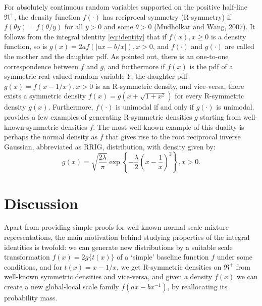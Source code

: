 \documentclass[lineno]{biometrika}
\begin{document}
For absolutely continuous random variables supported on the positive half-line $\Re^{+}$, the density function $f(\cdot)$ has reciprocal symmetry (R-symmetry) if $f(\theta y) = f(\theta / y)$ for all $y > 0$ and some $\theta >0$ (Mudholkar and Wang, 2007). It follows from the integral identity \eqref{eq:identity} that if $f(x), x \geq 0$ is a density function, so is $g(x) = 2a f(|ax-b/x|), x >0$, and $f(\cdot)$ and $g(\cdot)$ are called the mother and the daughter pdf. As \cite{chaubey2010reciprocal} pointed out, there is an one-to-one correspondence between $f$ and $g$, and furthermore if $f(x)$ is the pdf of a symmetric real-valued random variable $Y$, the daughter pdf $g(x) = f(x-1/x), x>0$ is an R-symmetric density, and vice-versa, there exists a symmetric density $f(x) = g(x+\sqrt{1+x^2})$ for every R-symmetric density $g(x)$. Furthermore, $f(\cdot)$ is unimodal if and only if $g(\cdot)$ is unimodal. \cite{chaubey2010reciprocal} provides a few examples of generating R-symmetric densities $g$ starting from well-known symmetric densities $f$. The most well-known example of this duality is perhaps the normal density as $f$ that gives rise to the root reciprocal inverse Gaussian, abbreviated as RRIG, distribution, with density given by: 
$$
g(x) = \sqrt{\frac{2\lambda}{\pi}} \exp \left\{ - \frac{\lambda}{2} \left( x - \frac{1}{x} \right)^2 \right\}, x >0.
$$

\section{Discussion}

Apart from providing simple proofs for well-known normal scale mixture representations, the main motivation behind studying properties of the integral identities is twofold: we can generate new distributions by a suitable scale transformation $f(x) = 2g\{ t(x) \}$ of a `simple' baseline function $f$ under some conditions, and for $t(x) = x - 1/x$, we get R-symmetric densities on $\Re^+$ from well-known symmetric densities and vice-versa, and given a density $f(x)$ we can create a new global-local scale family $f(ax-bx^{-1})$, by reallocating its probability mass. 
\end{document}
